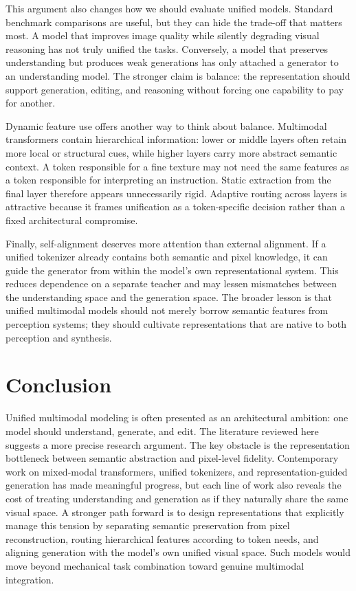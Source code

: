 \documentclass[12pt]{article}
\begin{document}
This argument also changes how we should evaluate unified models. Standard benchmark comparisons are useful, but they can hide the trade-off that matters most. A model that improves image quality while silently degrading visual reasoning has not truly unified the tasks. Conversely, a model that preserves understanding but produces weak generations has only attached a generator to an understanding model. The stronger claim is balance: the representation should support generation, editing, and reasoning without forcing one capability to pay for another.

Dynamic feature use offers another way to think about balance. Multimodal transformers contain hierarchical information: lower or middle layers often retain more local or structural cues, while higher layers carry more abstract semantic context. A token responsible for a fine texture may not need the same features as a token responsible for interpreting an instruction. Static extraction from the final layer therefore appears unnecessarily rigid. Adaptive routing across layers is attractive because it frames unification as a token-specific decision rather than a fixed architectural compromise.

Finally, self-alignment deserves more attention than external alignment. If a unified tokenizer already contains both semantic and pixel knowledge, it can guide the generator from within the model's own representational system. This reduces dependence on a separate teacher and may lessen mismatches between the understanding space and the generation space. The broader lesson is that unified multimodal models should not merely borrow semantic features from perception systems; they should cultivate representations that are native to both perception and synthesis.

\section{Conclusion}

Unified multimodal modeling is often presented as an architectural ambition: one model should understand, generate, and edit. The literature reviewed here suggests a more precise research argument. The key obstacle is the representation bottleneck between semantic abstraction and pixel-level fidelity. Contemporary work on mixed-modal transformers, unified tokenizers, and representation-guided generation has made meaningful progress, but each line of work also reveals the cost of treating understanding and generation as if they naturally share the same visual space. A stronger path forward is to design representations that explicitly manage this tension by separating semantic preservation from pixel reconstruction, routing hierarchical features according to token needs, and aligning generation with the model's own unified visual space. Such models would move beyond mechanical task combination toward genuine multimodal integration.



\end{document}
